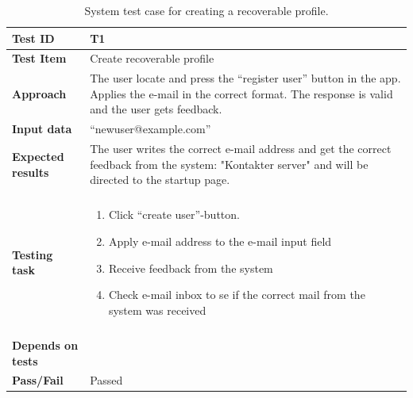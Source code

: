 \begin{appendices}
\begin{table}[H]
	\small
	\centering
	\caption{System test case for creating a recoverable profile.}
	\begin{tabular}[b]{ | l | l  |}
			\hline
			\textbf{Test ID} & T1  \\ \hline
			\textbf{Test Item} & Create recoverable profile \\ \hline
			\textbf{Approach} & \begin{minipage}{5in}The user locate and press the “register user” button in the app. Applies the e-mail in the correct format. The response is valid and the user gets feedback. \end{minipage}\\ \hline
			\textbf{Input data} &  “newuser@example.com”\\ \hline
			
			\textbf{Expected results} & \begin{minipage}{5in}The user writes the correct e-mail address and get the correct feedback from the system: "Kontakter server" and will be directed to the startup page.\end{minipage}\\ \hline&\\[-3.8ex]
		
			\textbf{Testing task} & \begin{minipage}{5in}
			\begin{enumerate}[noitemsep]
			\item Click  “create user”-button.
			\item Apply e-mail address to the e-mail input field 
			\item Receive feedback from the system
			\item Check e-mail inbox to se if the correct mail from the system was received 
			 \end{enumerate} \end{minipage}
			\\&\\[-3.8ex] \hline
			\textbf{Depends on tests}& \\ \hline	
			\textbf{Pass/Fail} & Passed \\\hline				
		\end{tabular}
	\label{Tab:systemTesting1}
\end{table}



\end{appendices}
